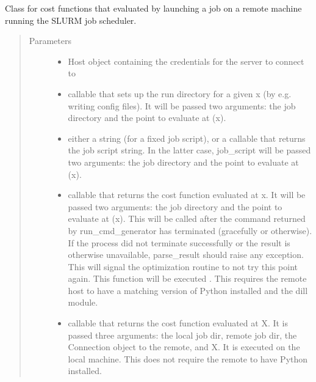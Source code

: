 \documentclass[letterpaper,12pt,english]{sphinxmanual}
\begin{document}
\begin{fulllineitems}
\sphinxAtStartPar
Class for cost functions that evaluated by launching a job on a remote machine running the SLURM job scheduler.
\begin{quote}\begin{description}
\item[{Parameters}] \leavevmode\begin{itemize}
\item {} 
\sphinxAtStartPar
{} \textendash{} Host object containing the credentials for the server to connect to

\item {} 
\sphinxAtStartPar
{} \textendash{} callable that sets up the run directory for a given x (by e.g. writing config files).     It will be passed two arguments: the job directory and the point to evaluate at (x).

\item {} 
\sphinxAtStartPar
{} \textendash{} either a string (for a fixed job script), or a callable that returns the job script string.     In the latter case, job\_script will be passed two arguments: the job directory and the point to evaluate at (x).

\item {} 
\sphinxAtStartPar
{} \textendash{} callable that returns the cost function evaluated at x.     It will be passed two arguments: the job directory and the point to evaluate at (x).     This will be called after the command returned by run\_cmd\_generator has terminated (gracefully or otherwise).     If the process did not terminate successfully or the result is otherwise unavailable, parse\_result     should raise any exception. This will signal the optimization routine to not try this point again.     This function will be executed . This requires the remote host to have a matching version     of Python installed and the dill module.

\item {} 
\sphinxAtStartPar
{} \textendash{} callable that returns the cost function evaluated at X.     It is passed three arguments: the local job dir, remote job dir, the Connection object to the remote, and X.     It is executed on the local machine. This does not require the remote to have Python installed.


\end{itemize}
\end{description}
\end{quote}
\end{fulllineitems}
\end{document}
